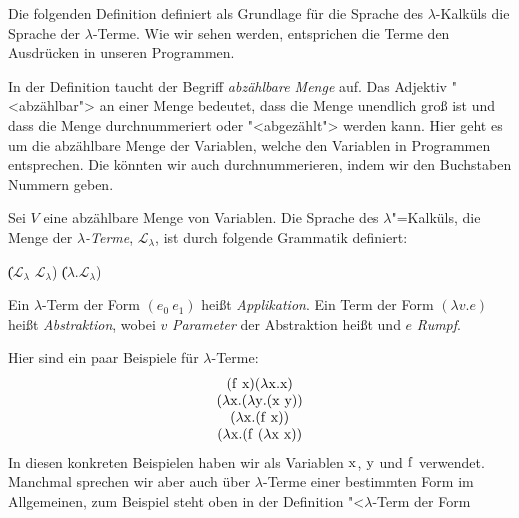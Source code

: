 Die folgenden Definition definiert als Grundlage für die Sprache des
$\lambda$-Kalküls die Sprache der $\lambda$-Terme.  Wie wir sehen
werden, entsprichen die Terme den Ausdrücken in unseren Programmen. 

In der Definition taucht der Begriff \textit{abzählbare
  Menge} auf.  Das Adjektiv "<abzählbar"> an
einer Menge bedeutet, dass die Menge unendlich groß ist und dass die
Menge durchnummeriert oder "<abgezählt"> werden kann.  Hier geht es um
die abzählbare Menge der Variablen, welche den Variablen in Programmen
entsprechen.  Die könnten wir auch durchnummerieren, indem wir den
Buchstaben Nummern geben.

\begin{definition}
  
  Sei $V$ eine abzählbare Menge von Variablen. 
  Die Sprache des $\lambda$"=Kalküls, die Menge der
  \textit{$\lambda$-Terme},
  $\mathcal{L}_{\lambda}$, ist
  durch folgende Grammatik definiert:
  \begin{grammar}
     \: 
    \> \| ($\mathcal{L}_{\lambda}$ $\mathcal{L}_{\lambda}$)
    \> \| ($\lambda$.$\mathcal{L}_{\lambda}$)
  \end{grammar}
%
  Ein $\lambda$-Term der Form $(e_0~e_1)$ heißt
  \textit{Applikation}. Ein Term der Form
  $(\lambda v.e)$ heißt \textit{Abstraktion}, wobei
  $v$ \textit{Parameter} der Abstraktion heißt und
  $e$ \textit{Rumpf}.
\end{definition}
%
Hier sind ein paar Beispiele für $\lambda$-Terme:
%
\begin{displaymath}
  \begin{array}{c}
    (\mathrm f~\mathrm x)
    (\lambda \mathrm x.\mathrm x)\\
    (\lambda \mathrm x.(\lambda \mathrm y.(\mathrm x~\mathrm y))\\
    (\lambda \mathrm x.(\mathrm f~\mathrm x))\\
    (\lambda \mathrm x.(\mathrm f~(\lambda \mathrm x~\mathrm x))
  \end{array}
\end{displaymath}
% 
In diesen konkreten Beispielen haben wir als Variablen $\mathrm x$, $\mathrm y$ und
$\mathrm f$ verwendet.  Manchmal sprechen wir aber auch über
$\lambda$-Terme einer bestimmten Form im Allgemeinen, zum Beispiel
steht oben in der Definition "<$\lambda$-Term der Form
